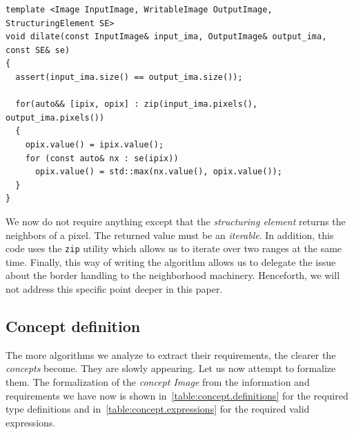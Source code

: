\begin{verbatim}
template <Image InputImage, WritableImage OutputImage, StructuringElement SE>
void dilate(const InputImage& input_ima, OutputImage& output_ima, const SE& se)
{
  assert(input_ima.size() == output_ima.size());

  for(auto&& [ipix, opix] : zip(input_ima.pixels(), output_ima.pixels())
  {
    opix.value() = ipix.value();
    for (const auto& nx : se(ipix))
      opix.value() = std::max(nx.value(), opix.value());
  }
}
\end{verbatim}

\noindent We now do not require anything except that the \emph{structuring element} returns the neighbors of a pixel.
The returned value must be an \emph{iterable}. In addition, this code uses the \texttt{zip} utility which allows us to
iterate over two ranges at the same time. Finally, this way of writing the algorithm allows us to delegate the issue
about the border handling to the neighborhood machinery. Henceforth, we will not address this specific point deeper in
this paper.

\subsection{Concept definition}
\label{subsec:concept}

The more algorithms we analyze to extract their requirements, the clearer the \emph{concepts} become. They are slowly
appearing. Let us now attempt to formalize them. The formalization of the \emph{concept Image} from the information and
requirements we have now is shown in~\cref{table:concept.definitions} for the required type definitions and
in~\cref{table:concept.expressions} for the required valid expressions.


